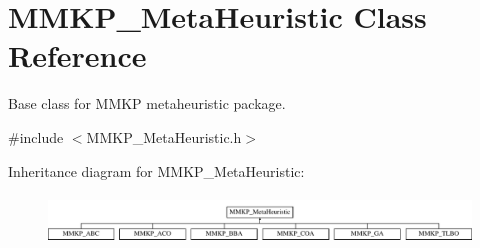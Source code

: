 \hypertarget{class_m_m_k_p___meta_heuristic}{\section{M\+M\+K\+P\+\_\+\+Meta\+Heuristic Class Reference}
\label{class_m_m_k_p___meta_heuristic}
}


Base class for M\+M\+K\+P metaheuristic package.  




{\ttfamily \#include $<$M\+M\+K\+P\+\_\+\+Meta\+Heuristic.\+h$>$}

Inheritance diagram for M\+M\+K\+P\+\_\+\+Meta\+Heuristic\+:\begin{figure}[H]
\begin{center}
\leavevmode
\includegraphics[height=1.305361cm]{class_m_m_k_p___meta_heuristic}
\end{center}
\end{figure}
